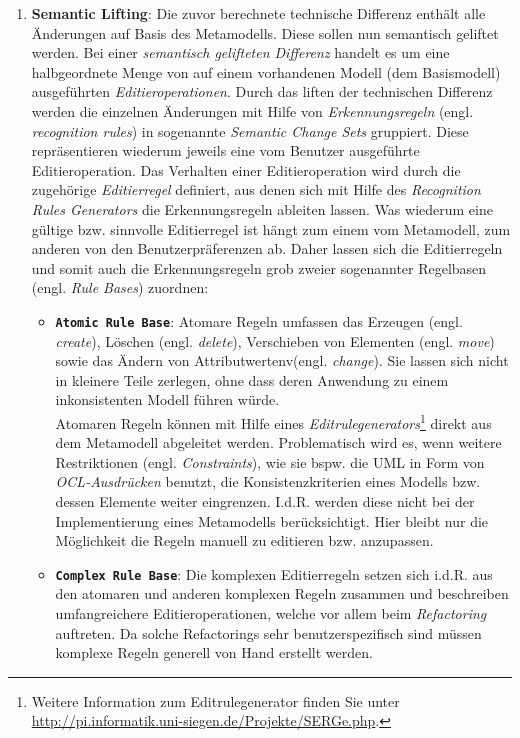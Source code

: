 \documentclass[a4paper]{scrartcl}
\begin{document}
\begin{enumerate}
\item \textbf{Semantic Lifting}:\label{page:semantic_change_sets}
Die zuvor berechnete technische Differenz enthält alle Än\-der\-ung\-en  auf Basis des Metamodells.
Diese sollen nun semantisch geliftet werden.
Bei einer \textit{semantisch gelifteten Differenz} handelt es um eine halbgeordnete Menge von auf einem vorhandenen Modell (dem Basismodell) ausgeführten \textit{Editieroperationen}.
Durch das liften der technischen Differenz werden die einzelnen Änderungen mit Hilfe von \textit{Erkennungsregeln} (engl. \textit{recognition rules}) in sogenannte \textit{Semantic Change Sets} gruppiert. Diese repräsentieren wiederum jeweils eine vom Benutzer ausgeführte Editieroperation.
Das Verhalten einer Editieroperation wird durch die zugehörige \textit{Editierregel} definiert, aus denen sich mit Hilfe des \textit{Recognition Rules Generators} die Erkennungsregeln ableiten lassen. 
Was wiederum eine gültige bzw. sinnvolle Editierregel ist hängt zum einem vom Metamodell, zum anderen von den Benutzerpräferenzen ab. 
Daher lassen sich die Editierregeln und somit auch die Erkennungsregeln grob zweier sogenannter Regelbasen (engl. \textit{Rule Bases}) zuordnen:

\begin{itemize}
\item \textbf{\texttt{Atomic Rule Base}}: 
Atomare Regeln umfassen das Erzeugen (engl. \textit{create}), Löschen (engl. \textit{delete}), Verschieben von Elementen (engl. \textit{move}) sowie das Ändern von Attributwertenv(engl. \textit{change}).
Sie lassen sich nicht in kleinere Teile zerlegen, ohne dass deren Anwendung zu einem inkonsistenten Modell führen würde.\\
Atomaren Regeln können mit Hilfe eines \textit{Editrulegenerators}\footnote{Weitere Information zum Editrulegenerator finden Sie unter \url{http://pi.informatik.uni-siegen.de/Projekte/SERGe.php}.} direkt aus dem Metamodell abgeleitet werden. 
Problematisch wird es, wenn weitere Restriktionen (engl. \textit{Constraints}), wie sie bspw. die UML in Form von \textit{OCL-Ausdrücken} benutzt, die Konsistenzkriterien eines Modells bzw. dessen Elemente weiter eingrenzen. 
I.d.R. werden diese nicht bei der Implementierung eines Metamodells berücksichtigt.
Hier bleibt nur die Möglichkeit die Regeln manuell zu editieren bzw. anzupassen.

\item \textbf{\texttt{Complex Rule Base}}: 
Die komplexen Editierregeln setzen sich i.d.R. aus den atomaren und anderen komplexen Regeln zusammen und beschreiben umfangreichere Editieroperationen, welche vor allem beim \textit{Refactoring} auftreten. 
Da solche Refactorings sehr benutzerspezifisch sind müssen komplexe Regeln generell von Hand erstellt werden.
\end{itemize}


\end{enumerate}
\end{document}
